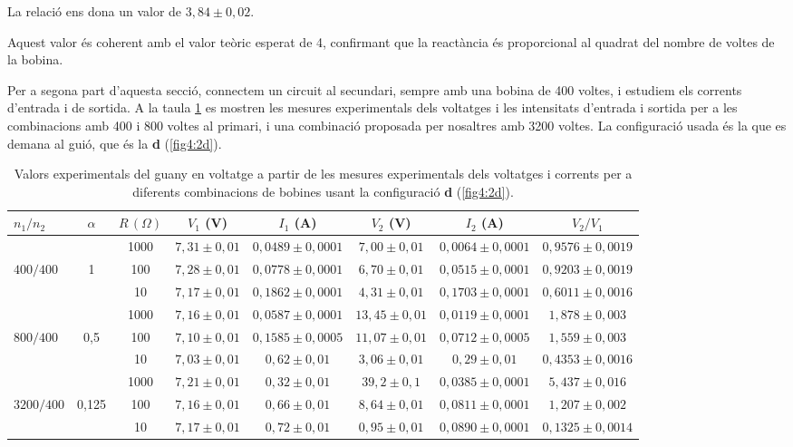 \documentclass[a4paper,10.5pt]{report}
\begin{document}
La relació ens dona un valor de $ 3,84 \pm 0,02 $. 

Aquest valor és coherent amb el valor teòric esperat de 4, confirmant que la reactància és proporcional al quadrat del nombre de voltes de la bobina. 

Per a segona part d'aquesta secció, connectem un circuit al secundari, sempre amb una bobina de 400 voltes, i estudiem els corrents d’entrada i de sortida. A la taula \ref{tab:4.4} es mostren les mesures experimentals dels voltatges i les intensitats d'entrada i sortida per a les combinacions amb 400 i 800 voltes al primari, i una combinació proposada per nosaltres amb 3200 voltes. La configuració usada és la que es demana al guió, que és la \textbf{d} (\ref{fig4:2d}). 

\begin{table}[H]
	\centering
	\renewcommand{\arraystretch}{1.2}
	\caption{Valors experimentals del guany en voltatge a partir de les mesures experimentals dels voltatges i corrents per a diferents combinacions de bobines usant la configuració \textbf{d} (\ref{fig4:2d}).}
	\begin{tabular}{lccccccc}
		\toprule
		$n_1/n_2$ & $\alpha$ & $R\,(\Omega)$ & $V_1$ (V) & $I_1$ (A) & $V_2$ (V) & $I_2$ (A) & $V_2/V_1$ \\
		\midrule
		& & 1000 & $7{,}31 \pm 0{,}01$ & $0{,}0489 \pm 0{,}0001$ & $7{,}00 \pm 0{,}01$ & $0{,}0064 \pm 0{,}0001$ & $0{,}9576 \pm 0{,}0019$ \\
		$400/400$ & 1 & 100  & $7{,}28 \pm 0{,}01$ & $0{,}0778 \pm 0{,}0001$ & $6{,}70 \pm 0{,}01$ & $0{,}0515 \pm 0{,}0001$ & $0{,}9203 \pm 0{,}0019$  \\
		& & 10   & $7{,}17 \pm 0{,}01$ & $0{,}1862 \pm 0{,}0001$ & $4{,}31 \pm 0{,}01$ & $0{,}1703 \pm 0{,}0001$ & $0{,}6011 \pm 0{,}0016$\\
		\midrule
		& & 1000 & $7{,}16 \pm 0{,}01$ & $0{,}0587 \pm 0{,}0001$ & $13{,}45 \pm 0{,}01$ & $0{,}0119 \pm 0{,}0001$ & $1{,}878 \pm 0{,}003$  \\
		$800/400$ & 0{,}5 & 100  & $7{,}10 \pm 0{,}01$ & $0{,}1585 \pm 0{,}0005$ & $11{,}07 \pm 0{,}01$ & $0{,}0712 \pm 0{,}0005$ & $1{,}559 \pm 0{,}003$ \\
		& & 10   & $7{,}03 \pm 0{,}01$ & $0{,}62 \pm 0{,}01$ & $3{,}06 \pm 0{,}01$ & $0{,}29 \pm 0{,}01$ & $0{,}4353 \pm 0{,}0016$ \\
		\midrule
		& & 1000 & $7{,}21 \pm 0{,}01$ & $0{,}32 \pm 0{,}01$ & $39{,}2 \pm 0{,}1$ & $0{,}0385 \pm 0{,}0001$ & $5{,}437 \pm 0{,}016$ \\
		$3200/400$ & 0{,}125 & 100  & $7{,}16 \pm 0{,}01$ & $0{,}66 \pm 0{,}01$ & $8{,}64 \pm 0{,}01$ & $0{,}0811 \pm 0{,}0001$ & $1{,}207 \pm 0{,}002$  \\
		& & 10   & $7{,}17 \pm 0{,}01$ & $0{,}72 \pm 0{,}01$ & $0{,}95 \pm 0{,}01$ & $0{,}0890 \pm 0{,}0001$ & $0{,}1325 \pm 0{,}0014$ \\
		\bottomrule
	\end{tabular}
	\label{tab:4.4}
\end{table}
\end{document}

